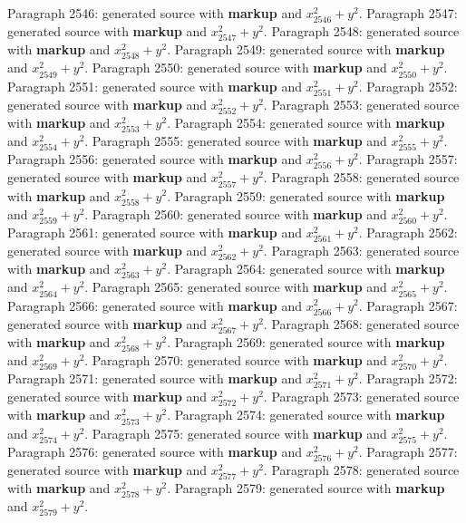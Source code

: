 \documentclass{article}
\begin{document}
Paragraph 2546: generated source with \textbf{markup} and $x_{2546}^2 + y^2$.
Paragraph 2547: generated source with \textbf{markup} and $x_{2547}^2 + y^2$.
Paragraph 2548: generated source with \textbf{markup} and $x_{2548}^2 + y^2$.
Paragraph 2549: generated source with \textbf{markup} and $x_{2549}^2 + y^2$.
Paragraph 2550: generated source with \textbf{markup} and $x_{2550}^2 + y^2$.
Paragraph 2551: generated source with \textbf{markup} and $x_{2551}^2 + y^2$.
Paragraph 2552: generated source with \textbf{markup} and $x_{2552}^2 + y^2$.
Paragraph 2553: generated source with \textbf{markup} and $x_{2553}^2 + y^2$.
Paragraph 2554: generated source with \textbf{markup} and $x_{2554}^2 + y^2$.
Paragraph 2555: generated source with \textbf{markup} and $x_{2555}^2 + y^2$.
Paragraph 2556: generated source with \textbf{markup} and $x_{2556}^2 + y^2$.
Paragraph 2557: generated source with \textbf{markup} and $x_{2557}^2 + y^2$.
Paragraph 2558: generated source with \textbf{markup} and $x_{2558}^2 + y^2$.
Paragraph 2559: generated source with \textbf{markup} and $x_{2559}^2 + y^2$.
Paragraph 2560: generated source with \textbf{markup} and $x_{2560}^2 + y^2$.
Paragraph 2561: generated source with \textbf{markup} and $x_{2561}^2 + y^2$.
Paragraph 2562: generated source with \textbf{markup} and $x_{2562}^2 + y^2$.
Paragraph 2563: generated source with \textbf{markup} and $x_{2563}^2 + y^2$.
Paragraph 2564: generated source with \textbf{markup} and $x_{2564}^2 + y^2$.
Paragraph 2565: generated source with \textbf{markup} and $x_{2565}^2 + y^2$.
Paragraph 2566: generated source with \textbf{markup} and $x_{2566}^2 + y^2$.
Paragraph 2567: generated source with \textbf{markup} and $x_{2567}^2 + y^2$.
Paragraph 2568: generated source with \textbf{markup} and $x_{2568}^2 + y^2$.
Paragraph 2569: generated source with \textbf{markup} and $x_{2569}^2 + y^2$.
Paragraph 2570: generated source with \textbf{markup} and $x_{2570}^2 + y^2$.
Paragraph 2571: generated source with \textbf{markup} and $x_{2571}^2 + y^2$.
Paragraph 2572: generated source with \textbf{markup} and $x_{2572}^2 + y^2$.
Paragraph 2573: generated source with \textbf{markup} and $x_{2573}^2 + y^2$.
Paragraph 2574: generated source with \textbf{markup} and $x_{2574}^2 + y^2$.
Paragraph 2575: generated source with \textbf{markup} and $x_{2575}^2 + y^2$.
Paragraph 2576: generated source with \textbf{markup} and $x_{2576}^2 + y^2$.
Paragraph 2577: generated source with \textbf{markup} and $x_{2577}^2 + y^2$.
Paragraph 2578: generated source with \textbf{markup} and $x_{2578}^2 + y^2$.
Paragraph 2579: generated source with \textbf{markup} and $x_{2579}^2 + y^2$.
\end{document}

